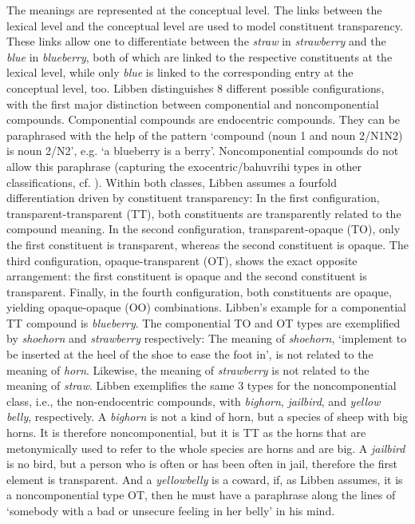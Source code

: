 The meanings are represented at the conceptual level. The links
between the lexical level and the conceptual level are used to model
constituent transparency. These links allow one to differentiate between
the \emph{straw} in \emph{strawberry} and the \emph{blue} in
\emph{blueberry}, both of which are linked to the respective
constituents at the lexical level, while only \emph{blue} is linked to
the corresponding entry at the conceptual level, too. Libben
distinguishes 8 different possible
configurations, with the first major distinction between componential
and noncomponential compounds. Componential compounds are endocentric
compounds. They can be paraphrased with the help of the pattern
`compound (noun 1 and noun 2/N1N2) is noun 2/N2', e.g. `a blueberry is a berry'. 
Noncomponential compounds do not allow this paraphrase (capturing
 the exocentric/bahuvrihi types in other classifications,
 cf. \citealt[Footnote 1]{Libben:1998}). Within both classes, Libben assumes a
 fourfold differentiation driven by constituent transparency: In the
 first configuration, transparent-transparent (TT), 
 both constituents are transparently related to the compound
 meaning. In the second configuration, transparent-opaque (TO), only the first constituent is
 transparent, whereas the second constituent is opaque. The third configuration, opaque-transparent (OT), shows the exact opposite arrangement: the first constituent is opaque and the second constituent is transparent. Finally, in the fourth configuration, both constituents are
 opaque, yielding opaque-opaque (OO) combinations. Libben's example for a
 componential TT compound is \emph{blueberry}. The componential TO and OT types are exemplified by \emph{shoehorn}
 and \emph{strawberry} respectively: The
 meaning of \emph{shoehorn}, `implement to be inserted at the heel of
 the shoe to ease the foot in', is not related to the meaning of
 \emph{horn}. Likewise, the meaning of \emph{strawberry} is not related to the meaning of
 \emph{straw}. Libben exemplifies the
 same 3 types for the noncomponential class, i.e., the
 non-endocentric compounds, with
 \emph{bighorn}, \emph{jailbird}, and \emph{yellow belly},
 respectively. A \emph{bighorn} is not a kind of horn, but a species
 of sheep with big horns. It is therefore noncomponential, but it is
 TT as the horns that are metonymically used to refer to the whole
 species are horns and are big. A \emph{jailbird} is no bird, but a
 person who is often or has been often in jail, therefore the first
 element is transparent. And a \emph{yellowbelly} is a coward, if,
 as Libben assumes, it is a noncomponential type OT, then he must have
 a paraphrase along the lines of `somebody with a bad or unsecure feeling in her
 belly' in his mind. 

